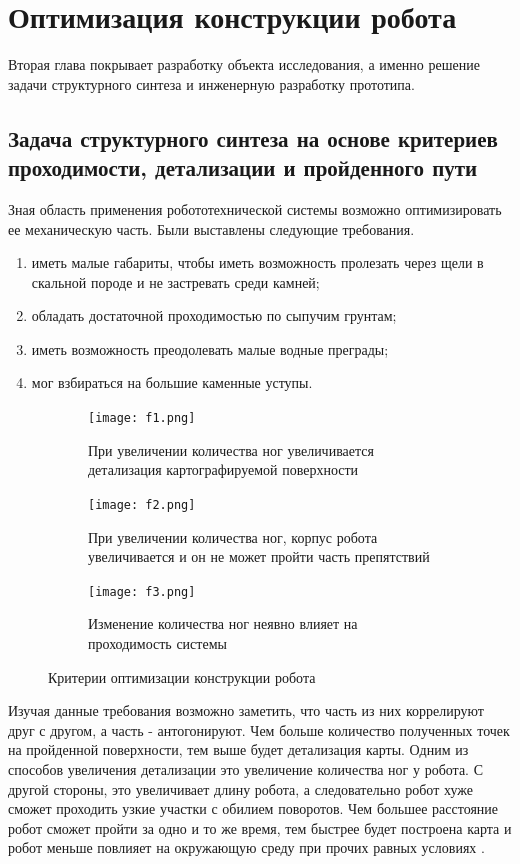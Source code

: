 \chapter{Оптимизация конструкции робота}\label{ch:ch2}

Вторая глава покрывает разработку объекта исследования, а именно решение задачи структурного синтеза и инженерную разработку прототипа.

\section{Задача структурного синтеза на основе критериев проходимости, детализации и пройденного пути}

Зная область применения робототехнической системы возможно оптимизировать ее механическую часть. Были выставлены следующие требования.
\begin{enumerate}
    \item иметь малые габариты, чтобы иметь возможность пролезать через щели в скальной породе и не застревать среди камней;
    \item обладать достаточной проходимостью по сыпучим грунтам;
    \item иметь возможность преодолевать малые водные преграды;
    \item мог взбираться на большие каменные уступы.
\end{enumerate}

\begin{figure}[ht!]
    \begin{subfigure}{0.9\textwidth}
        \centering\texttt{[image: f1.png]}
        \caption{При увеличении количества ног увеличивается детализация картографируемой поверхности}
        \label{fig:f1.png}
    \end{subfigure}

    \begin{subfigure}{0.9\textwidth}
        \centering\texttt{[image: f2.png]}
        \caption{При увеличении количества ног, корпус робота увеличивается и он не может пройти часть препятствий}
        \label{fig:f2.png}
    \end{subfigure}

    \begin{subfigure}{0.9\textwidth}
        \centering\texttt{[image: f3.png]}
        \caption{Изменение количества ног неявно влияет на проходимость системы}
        \label{fig:f3.png}
    \end{subfigure}

\caption{Критерии оптимизации конструкции робота}
\label{fig:opti_criteria}
\end{figure}
Изучая данные требования возможно заметить, что часть из них коррелируют друг с другом, а часть - антогонируют. Чем больше количество полученных точек на пройденной поверхности, тем выше будет детализация карты. Одним из способов увеличения детализации это увеличение количества ног у робота. С другой стороны, это увеличивает длину робота, а следовательно робот хуже сможет проходить узкие участки с обилием поворотов. Чем большее расстояние робот сможет пройти за одно и то же время, тем быстрее будет построена карта и робот меньше повлияет на окружающую среду при прочих равных условиях . 

